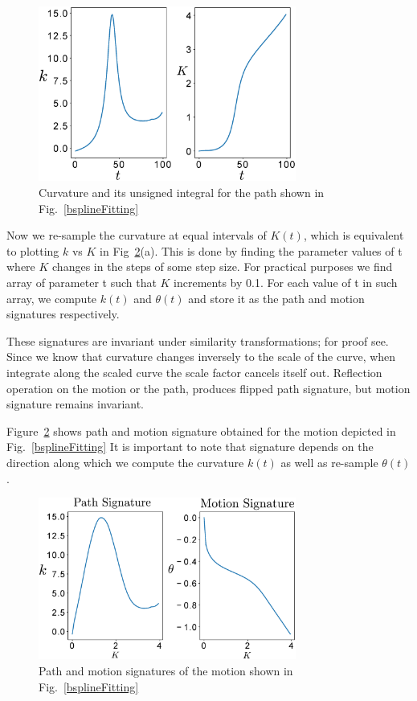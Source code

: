 \documentclass[twocolumn,10pt]{asme2e}
\begin{document}
\begin{figure}
\centering
\includegraphics[width=240pt]{figure/fig_curvatureK.eps}
  \caption{Curvature and its unsigned integral for the path shown in Fig.~\ref{bsplineFitting}}
\label{curvatureK}
\end{figure}

Now we re-sample the curvature at equal intervals of $K(t)$, which is equivalent to plotting $k$ vs $K$ in Fig~\ref{signature}(a).
This is done by finding the parameter values of t where $K$ changes in the steps of some step size. For practical purposes we find array of parameter t such that $K$ increments by 0.1.
For each value of t in such array, we compute $k(t)$ and $\theta(t)$ and store it as the path and motion signatures respectively.

These signatures are invariant under similarity transformations; for proof see\cite{cui2009}.
Since we know that curvature changes inversely to the scale of the curve, when integrate along the scaled curve the scale factor cancels itself out.
Reflection operation on the motion or the path, produces flipped path signature, but motion signature remains invariant.

Figure~\ref{signature} shows path and motion signature obtained for the motion depicted in Fig.~\ref{bsplineFitting}
It is important to note that signature depends on the direction along which we compute the curvature $k(t)$ as well as re-sample $\theta(t)$.

\begin{figure}
\centering
\includegraphics[width=240pt]{figure/fig_signatures.eps}
  \caption{Path and motion signatures of the motion shown in Fig.~\ref{bsplineFitting}}
\label{signature}
\end{figure}
\end{document}
